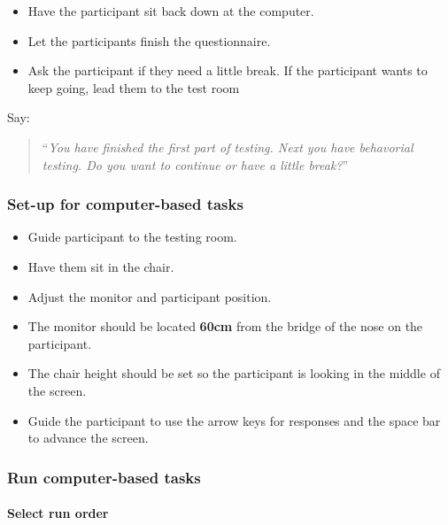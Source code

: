 \documentclass[]{article}
\providecommand{\tightlist}{%
  \setlength{\itemsep}{0pt}\setlength{\parskip}{0pt}}
\let\oldparagraph\paragraph
\renewcommand{\paragraph}[1]{\oldparagraph{#1}\mbox{}}
\begin{document}
\begin{itemize}
\tightlist
\item
  Have the participant sit back down at the computer.
\item
  Let the participants finish the questionnaire.
\item
  Ask the participant if they need a little break. If the participant
  wants to keep going, lead them to the test room
\end{itemize}

Say:

\begin{quote}
``\emph{You have finished the first part of testing. Next you have
behavorial testing. Do you want to continue or have a little break?}''
\end{quote}

\hypertarget{set-up-for-computer-based-tasks-1}{%
\subsubsection{Set-up for computer-based
tasks}\label{set-up-for-computer-based-tasks-1}}

\begin{itemize}
\tightlist
\item
  Guide participant to the testing room.
\item
  Have them sit in the chair.
\item
  Adjust the monitor and participant position.
\item
  The monitor should be located \textbf{60cm} from the bridge of the
  nose on the participant.
\item
  The chair height should be set so the participant is looking in the
  middle of the screen.
\item
  Guide the participant to use the arrow keys for responses and the
  space bar to advance the screen.
\end{itemize}

\hypertarget{run-computer-based-tasks}{%
\subsubsection{Run computer-based
tasks}\label{run-computer-based-tasks}}

\hypertarget{select-run-order}{%
\paragraph{Select run order}\label{select-run-order}}
\end{document}
